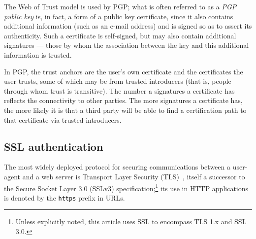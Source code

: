 \documentclass{llncs}
\begin{document}
The Web of Trust model is used by PGP; what is often referred to as a
{\em PGP public key} is, in fact, a form of a public key certificate,
since it also contains additional information (such as an e-mail
address) and is signed so as to assert its authenticity. Such a
certificate is self-signed, but may also contain additional signatures
--- those by whom the association between the key and this additional
information is trusted.

In PGP, the trust anchors are the user's own certificate and the
certificates the user trusts, some of which may be from trusted
introducers (that is, people through whom trust is transitive).
The number a signatures a certificate has reflects the connectivity
to other parties. The more signatures a certificate has, the
more likely it is that a third party will be able to find a certification
path to that certificate via trusted introducers.

%

\subsection{SSL authentication}
\label{sec:tlsauth}

The most widely deployed protocol for securing communications between
a user-agent and a web server is Transport Layer Security
(TLS)~\cite{rfc2246}, itself a successor to the Secure Socket Layer
3.0 (SSLv3) specification;\footnote{Unless explicitly noted, this
  article uses SSL to encompass TLS 1.x and SSL 3.0.} its use in HTTP
applications is denoted by the {\tt https} prefix in URLs.
\end{document}
